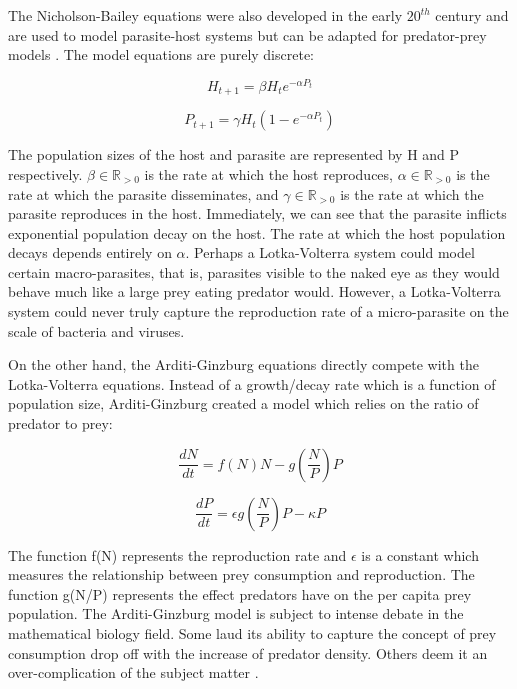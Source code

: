 \documentclass[11pt,a4paper]{scrartcl}
\theoremstyle{definition}
\begin{document}
The Nicholson-Bailey equations were also developed in the early $20^{th}$ century and are used to model parasite-host systems but can be adapted for predator-prey models \cite{Logan}. The model equations are purely discrete:

\begin{equation} \label{eq28}
	H_{t+1}=\beta H_te^{-\alpha P_t}
\end{equation}

\begin{equation} \label{eq29}
	P_{t+1}=\gamma H_t(1-e^{-\alpha P_t})
\end{equation}

The population sizes of the host and parasite are represented by H and P respectively. $\beta \in \mathbb{R}_{>0}$ is the rate at which the host reproduces, $\alpha\in \mathbb{R}_{>0}$ is the rate at which the parasite disseminates, and $\gamma \in \mathbb{R}_{>0}$ is the rate at which the parasite reproduces in the host. Immediately, we can see that the parasite inflicts exponential population decay on the host. The rate at which the host population decays depends entirely on $\alpha$. Perhaps a Lotka-Volterra system could model certain macro-parasites, that is, parasites visible to the naked eye as they would behave much like a large prey eating predator would. However, a Lotka-Volterra system could never truly capture the reproduction rate of a micro-parasite on the scale of bacteria and viruses.\newline

On the other hand, the Arditi-Ginzburg equations directly compete with the Lotka-Volterra equations. Instead of a growth/decay rate which is a function of population size, Arditi-Ginzburg created a model which relies on the ratio of predator to prey:

\begin{equation} \label{eq30}
	\frac{dN}{dt}=f(N)N-g(\frac{N}{P})P
\end{equation}

\begin{equation} \label{eq31}
	\frac{dP}{dt}=\epsilon g(\frac{N}{P})P-\kappa P
\end{equation}

The function f(N) represents the reproduction rate and $\epsilon$ is a constant which measures the relationship between prey consumption and reproduction. The function g(N/P) represents the effect predators have on the per capita prey population. The Arditi-Ginzburg model is subject to intense debate in the mathematical biology field. Some laud its ability to capture the concept of prey consumption drop off with the increase of predator density. Others deem it an over-complication of the subject matter \cite{ratio1}.
\end{document}
